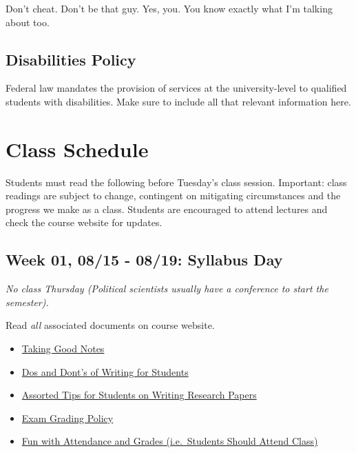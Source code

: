 \documentclass[11pt,]{article}
\providecommand{\tightlist}{%
  \setlength{\itemsep}{0pt}\setlength{\parskip}{0pt}}
\begin{document}
Don't cheat. Don't be that guy. Yes, you. You know exactly what I'm
talking about too.

\subsection{Disabilities Policy}\label{disabilities-policy}

Federal law mandates the provision of services at the university-level
to qualified students with disabilities. Make sure to include all that
relevant information here.

\newpage

\section{Class Schedule}\label{class-schedule}

Students must read the following before Tuesday's class session.
Important: class readings are subject to change, contingent on
mitigating circumstances and the progress we make as a class. Students
are encouraged to attend lectures and check the course website for
updates.

\subsection{Week 01, 08/15 - 08/19: Syllabus
Day}\label{week-01-0815---0819-syllabus-day}

\emph{No class Thursday (Political scientists usually have a conference
to start the semester).}

Read \emph{all} associated documents on course website.

\begin{itemize}
\tightlist
\item
  \href{http://svmiller.com/blog/2014/09/taking-good-notes/}{Taking Good
  Notes}
\item
  \href{http://svmiller.com/blog/2015/06/dos-and-donts-of-writing-for-students/}{Dos
  and Dont's of Writing for Students}
\item
  \href{http://svmiller.com/blog/2015/12/assorted-tips-students-research-papers/}{Assorted
  Tips for Students on Writing Research Papers}
\item
  \href{https://www.dropbox.com/s/apihjs7di81aqcv/svm-exam-grading-policy.pdf?dl=0}{Exam
  Grading Policy}
\item
  \href{http://svmiller.com/blog/2016/05/fun-with-attendance-grades/}{Fun
  with Attendance and Grades (i.e.~Students Should Attend Class)}
\end{itemize}
\end{document}
